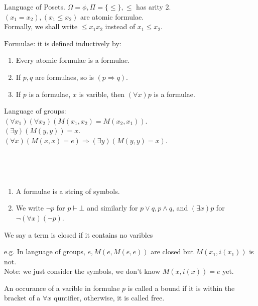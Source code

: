 \begin{example} Language of Posets. $\Omega = \phi, \Pi = \{\le\}, \le$ has arity 2.\\
$(x_1=x_2), (x_1 \le x_2)$ are atomic formulae.\\
Formally, we shall write $\le x_1 x_2$ instead of $x_1 \le x_2$.
\end{example}
$\underline{\text{Formulae}}$: it is defined inductively by:
\begin{enumerate}
\item Every atomic formulae is a formulae.\\
\item If $p,q$ are formulaes, so is $(p \Rightarrow q)$.\\
\item If $p$ is a formulae, $x$ is varible, then $(\forall x)p$ is a formulae.
\end{enumerate}
\begin{example} Language of groups:\\
$(\forall x_1)(\forall x_2)(M(x_1,x_2)=M(x_2,x_1))$.\\
$(\exists y)(M(y,y))=x$.\\
$(\forall x)(M(x,x)=e) \Rightarrow (\exists y)(M(y,y)=x)$.
\end{example}
~\\
\begin{remark}
~\\
\begin{enumerate}
\item A formulae is a string of symbols.\\
\item We write $\neg p$ for $p \vdash \bot$ and similarly for $p \vee q, p \wedge q$,
and $(\exists x)p$ for $\neg (\forall x)(\neg p)$.
\end{enumerate}
\end{remark}
\begin{definition} We say a term is closed if it contains no varibles
\end{definition}
e.g. In language of groups, $e, M(e,M(e,e))$ are closed but $M(x_1,i(x_1))$ is not.\\
Note: we just consider the symbols, we don't know $M(x,i(x))=e$ yet.
\begin{definition} An occurance of a varible in formulae $p$ is called a bound
if it is within the bracket of a $\forall x$ quntifier, otherwise, it is called free.
\end{definition}
~\\
